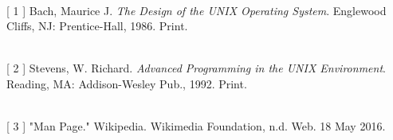 \documentclass[12pt]{extarticle}
\begin{document}
\ \\
{[} 1 {]} \hspace{1.2mm} Bach, Maurice J. \textit{The Design of the UNIX Operating System}. Englewood Cliffs, NJ:
\hspace*{1cm} Prentice-Hall, 1986. Print.

\ \\
{[} 2 {]} \hspace{1.2mm} Stevens, W. Richard. \textit{Advanced Programming in the UNIX Environment}. Reading,
\hspace*{1cm} MA: Addison-Wesley Pub., 1992. Print.

\ \\
{[} 3 {]} \hspace{1.2mm} "Man Page." Wikipedia. Wikimedia Foundation, n.d. Web. 18 May 2016.
\end{document}
